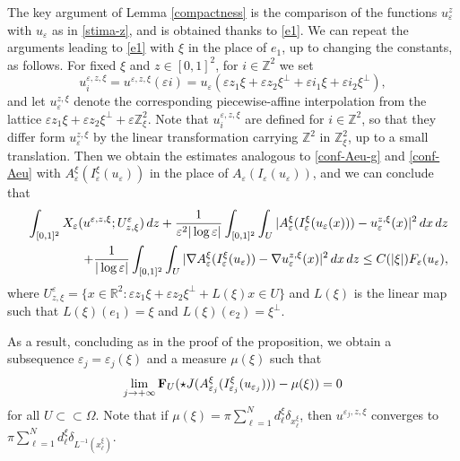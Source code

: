 \documentclass[10pt,a4paper]{amsart}
\def\e{\varepsilon}
\begin{document}
\begin{remark}
The key argument of Lemma \ref{compactness}  is the comparison of the functions $u_\e^z$ with $u_\e$ as in \eqref{stima-z}, and is obtained thanks to \eqref{e1}. 
We can repeat the arguments leading to \eqref{e1} with $\xi$ in the place of $e_1$, up to changing the constants, as follows. 
For fixed $\xi$ and $z\in[0,1]^2$, for $i\in\mathbb Z^2$ we set 
\begin{equation}\label{uexiz}
u^{\e,z,\xi}_i=u^{\e,z,\xi}(\e i)=u_\e(\e z_1\xi+\e z_2\xi^\perp+\e i_1 \xi +\e i_2 \xi^\perp), 
\end{equation} 
and let $u^{z,\xi}_\e$ denote the corresponding piecewise-affine interpolation from the lattice $\e z_1\xi+\e z_2\xi^\perp+\e \mathbb Z^2_\xi$. 
Note that $u^{\e,z,\xi}_i$ are defined for $i\in\mathbb Z^2$, so that they differ form $u_\e^{z,\xi}$ by the linear transformation carrying $\mathbb Z^2$ in $\mathbb Z^2_\xi$, up to a small translation.  
Then we obtain the estimates analogous to \eqref{conf-Aeu-g} and \eqref{conf-Aeu} with $A^\xi_{\e}(I^\xi_{\e}(u_{\e}))$ in the place of $A_{\e}(I_{\e}(u_{\e}))$, and we can conclude that 
\begin{eqnarray}\nonumber&&\hskip-1.5cm\int_{[0,1]^2} X_{\e} (u^{\e,z,\xi};U^\e_{z,\xi})\,dz +\frac{1}{\e^2|\log\e|}\int_{[0,1]^2} \int_U| A^\xi_{\e}(I^\xi_{\e}(u_{\e} (x))) - u^{z,\xi}_{\e}(x)|^2\, dx\,dz\\
&&\hskip1.5cm+
 \frac{1}{|\log{\e}|}\int_{[0,1]^2} \int_U| \nabla A^\xi_{\e}(I^\xi_{\e}(u_{\e})) - \nabla u^{z,\xi}_{\e}(x)|^2\, dx\,dz\le C(|\xi|) F_\e(u_\e), 
 \end{eqnarray}
where
$U^\e_{z,\xi}=\{x\in\mathbb R^2: \e z_1 \xi+\e z_2\xi^\perp +L(\xi)x\in U\}$ 
and $L(\xi)$ is the linear map such that $L(\xi)(e_1)=\xi$ and $L(\xi)(e_2)=\xi^\perp$. 

As a result, concluding as in the proof of the proposition, we obtain 
a subsequence $\e_j=\e_j(\xi)$ and 
a measure 
$\mu(\xi)$ such that 
\begin{equation}\label{defxi}\lim_{j\to+\infty}{\bf F}_U(\star J(A^\xi_{\e_j}(I_{\e_j}^\xi(u_{\e_j})))-\mu(\xi))=0\end{equation} 
for all $U\subset\subset\Omega$. 
Note that if $\mu(\xi)=\pi\sum_{\ell=1}^Nd^\xi_\ell\delta_{x^\xi_\ell}$, then $u^{\e_j,z,\xi}$ converges to 
$\pi\sum_{\ell=1}^Nd^\xi_\ell\delta_{L^{-1}(x^\xi_\ell)}$. 


\end{remark}
\end{document}
